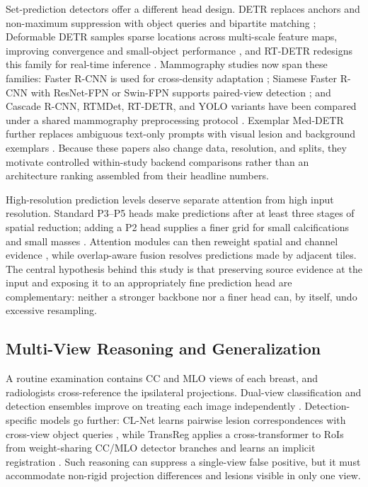 Set-prediction detectors offer a different head design.  DETR replaces anchors
and non-maximum suppression with object queries and bipartite matching
\cite{carion2020detr}; Deformable DETR samples sparse locations across
multi-scale feature maps, improving convergence and small-object performance
\cite{zhu2021deformabledetr}, and RT-DETR redesigns this family for real-time
inference \cite{zhao2024rtdetr}. Mammography studies now span these families:
Faster R-CNN is used for cross-density adaptation
\cite{nguyen2023crossdensity}; Siamese Faster R-CNN with ResNet-FPN or
Swin-FPN supports paired-view detection \cite{nguyen2023transreg}; and
Cascade R-CNN, RTMDet, RT-DETR, and YOLO variants have been compared under a
shared mammography preprocessing protocol \cite{abdikenov2025transfer}.
Exemplar Med-DETR further replaces ambiguous text-only prompts with visual
lesion and background exemplars \cite{bhat2025exemplar}.  Because these papers
also change data, resolution, and splits, they motivate controlled within-study
backend comparisons rather than an architecture ranking assembled from their
headline numbers.

High-resolution prediction levels deserve separate attention from high input
resolution.  Standard P3--P5 heads make predictions after at least three stages
of spatial reduction; adding a P2 head supplies a finer grid for small
calcifications and small masses \cite{bulatovic2025patched}.  Attention modules
can then reweight spatial and channel evidence \cite{woo2018cbam}, while
overlap-aware fusion resolves predictions made by adjacent tiles.  The central
hypothesis behind this study is that preserving source evidence at the input
and exposing it to an appropriately fine prediction head are complementary:
neither a stronger backbone nor a finer head can, by itself, undo excessive
resampling.

\subsection{Multi-View Reasoning and Generalization}
\label{sec:background_multiview}

A routine examination contains CC and MLO views of each breast, and radiologists
cross-reference the ipsilateral projections.  Dual-view classification and
detection ensembles improve on treating each image independently
\cite{kebede2024dualview}.  Detection-specific models go further: CL-Net learns
pairwise lesion correspondences with cross-view object queries
\cite{zhao2022checklink}, while TransReg applies a cross-transformer to RoIs
from weight-sharing CC/MLO detector branches and learns an implicit
registration \cite{nguyen2023transreg}.  Such reasoning can suppress a
single-view false positive, but it must accommodate non-rigid projection
differences and lesions visible in only one view.

